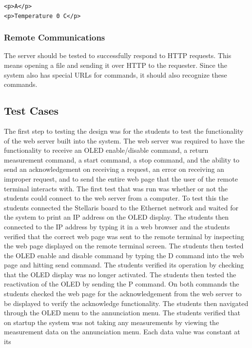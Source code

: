 \documentclass[12pt]{article} %
\begin{document}
\begin{lstlisting}[caption=Command Response, captionpos=b, label=lst:comm]
<p>A</p>
<p>Temperature 0 C</p>
\end{lstlisting}

    \subsubsection{Remote Communications}  The server should be tested to
    successfully respond to HTTP requests.  This means opening a file and sending
    it over HTTP to the requester.  Since the system also has special URLs for 
    commands, it should also recognize these commands.


    \subsection{Test Cases}
The first step to testing the design was for the students to test the functionality of the 
web server built into the system. The web server was required to have the functionality to receive an
OLED enable/disable command, a return measurement command, a start command, a stop command, and the
ability to send an acknowledgement on receiving a request, an error on receiving an improper request,
and to send the entire web page that the user of the remote terminal interacts with. The first test that
was run was whether or not the students could connect to the web server from a computer. To test this the
students connected the Stellaris board to the Ethernet network and waited for the system to print an IP address
on the OLED display. The students then connected to the  IP address by typing it in a web browser and the students 
verified that the correct web page was sent to the remote terminal by inspecting the web page displayed on the remote 
terminal screen. The students then tested the OLED enable and disable command by typing the D command into the web page 
and hitting send command. The students verified its operation by checking that the OLED display was no longer activated. 
The students then tested the reactivation of the OLED by sending the P command. On both commands the students checked the
web page for the acknowledgement from the web server to be displayed to verify the acknowledge functionality. The students 
then navigated through the OLED menu to the annunciation menu. The students verified that on startup the system was not 
taking any measurements by viewing the measurement data on the annunciation menu. Each data value was constant at its 
\end{document}
